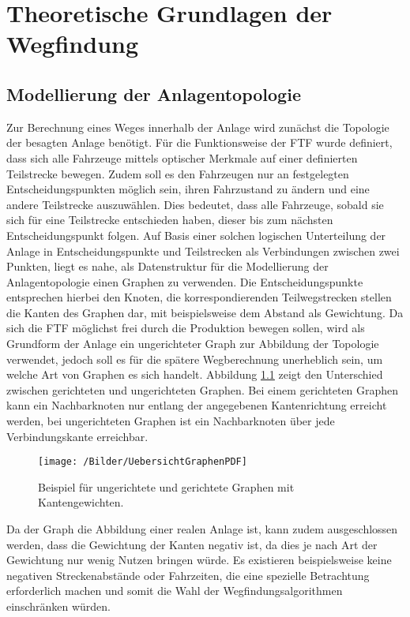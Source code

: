 \chapter{Theoretische Grundlagen  der Wegfindung}
	\label{Theorie}
\section{Modellierung der Anlagentopologie}
	\label{Graph_Anlage}
	Zur Berechnung eines Weges innerhalb der Anlage wird zunächst die Topologie der besagten Anlage benötigt. Für die Funktionsweise der \ac{FTF} wurde definiert, dass sich alle Fahrzeuge mittels optischer Merkmale auf einer definierten Teilstrecke bewegen. Zudem soll es den Fahrzeugen nur an festgelegten Entscheidungspunkten möglich sein, ihren Fahrzustand zu ändern und eine andere Teilstrecke auszuwählen. Dies bedeutet, dass alle Fahrzeuge, sobald sie sich für eine Teilstrecke entschieden haben, dieser bis zum nächsten Entscheidungspunkt folgen. Auf Basis einer solchen logischen Unterteilung der Anlage in Entscheidungspunkte und Teilstrecken als Verbindungen zwischen zwei Punkten, liegt es nahe, als Datenstruktur für die Modellierung der Anlagentopologie einen Graphen zu verwenden. Die Entscheidungspunkte entsprechen hierbei den Knoten, die korrespondierenden Teilwegstrecken stellen die Kanten des Graphen dar, mit beispielsweise dem Abstand als Gewichtung. Da sich die \ac{FTF} möglichst frei durch die Produktion bewegen sollen, wird als Grundform der Anlage ein ungerichteter Graph zur Abbildung der Topologie verwendet, jedoch soll es für die spätere Wegberechnung unerheblich sein, um welche Art von Graphen es sich handelt. Abbildung \ref{GraphenUebersicht} zeigt den Unterschied zwischen gerichteten und ungerichteten Graphen. Bei einem gerichteten Graphen kann ein Nachbarknoten nur entlang der angegebenen Kantenrichtung erreicht werden, bei ungerichteten Graphen ist ein Nachbarknoten über jede Verbindungskante erreichbar.

	\begin{figure}
		\centering
		\texttt{[image: /Bilder/UebersichtGraphenPDF]}
		\vspace{0.2cm}
		\caption{Beispiel für ungerichtete und gerichtete Graphen mit Kantengewichten.}\label{GraphenUebersicht}
	\end{figure}

	Da der Graph die Abbildung einer realen Anlage ist, kann zudem ausgeschlossen werden, dass die Gewichtung der Kanten negativ ist, da dies je nach Art der Gewichtung nur wenig Nutzen bringen würde. Es existieren beispielsweise keine negativen Streckenabstände oder Fahrzeiten, die eine spezielle Betrachtung erforderlich machen und somit die Wahl der Wegfindungsalgorithmen einschränken würden.
	

